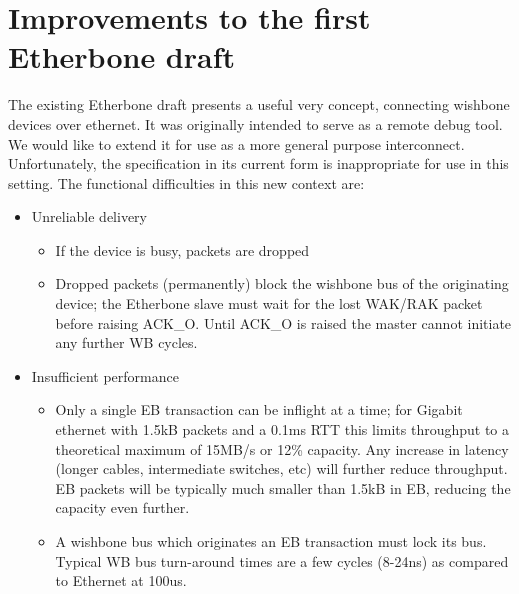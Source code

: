 \documentclass{article}
\begin{document}
\section{Improvements to the first Etherbone draft}

The existing Etherbone draft presents a useful very concept,
connecting wishbone devices over ethernet.
It was originally intended to serve as a remote debug tool.
We would like to extend it for use as a more general purpose interconnect.
Unfortunately, the specification in its current form is inappropriate
for use in this setting. 
The functional difficulties in this new context are:

\begin{itemize}
\item Unreliable delivery
\begin{itemize}
\item If the device is busy, packets are dropped
\item Dropped packets (permanently) block the wishbone bus of the
originating device;
the Etherbone slave must wait for the lost WAK/RAK packet before raising ACK\_O.
Until ACK\_O is raised the master cannot initiate any further WB cycles.
\end{itemize}
\item Insufficient performance
\begin{itemize}
\item Only a single EB transaction can be inflight at a time;
for Gigabit ethernet with 1.5kB packets and a 0.1ms RTT this limits
throughput to a theoretical maximum of 15MB/s or 12\% capacity. 
Any increase in latency (longer cables, intermediate switches, etc) 
will further reduce throughput.
EB packets will be typically much smaller than 1.5kB in EB,
reducing the capacity even further.
\item A wishbone bus which originates an EB transaction must lock its bus.
Typical WB bus turn-around times are a few cycles (8-24ns) as compared to
Ethernet at 100us. 
\end{itemize}
\end{itemize}
\end{document}
